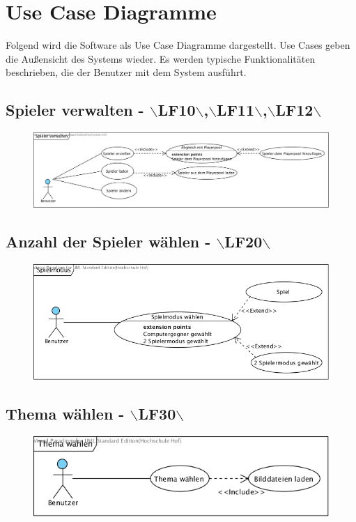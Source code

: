 \clearpage

\chapter{Use Case Diagramme}
Folgend wird die Software als Use Case Diagramme dargestellt. Use Cases geben die Außensicht des Systems wieder. Es werden typische Funktionalitäten beschrieben, die der Benutzer mit dem System ausführt.

\section{Spieler verwalten - $\backslash$LF10$\backslash$,$\backslash$LF11$\backslash$,$\backslash$LF12$\backslash$}
\begin{figure}[!h]
	\centering
    \includegraphics[width=\textwidth]{./SpielerVerwalten.png}
	\label{layout_gesamt}
\end{figure}

\clearpage
\section{Anzahl der Spieler wählen - $\backslash$LF20$\backslash$}
\begin{figure}[!h]
	\centering
    \includegraphics[width=\textwidth]{./AnzahlSpieler.png}
	\label{layout_gesamt}
\end{figure}

\clearpage
\section{Thema wählen - $\backslash$LF30$\backslash$}
\begin{figure}[!h]
	\centering
    \includegraphics[width=\textwidth]{./Thema.png}
    
	\label{layout_gesamt}
\end{figure}

